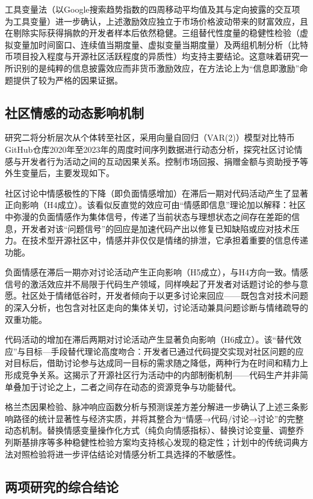 工具变量法（以Google搜索趋势指数的四周移动平均值及其与定向披露的交互项为工具变量）进一步确认，上述激励效应独立于市场价格波动带来的财富效应，且在剔除实际获得捐款的开发者样本后依然稳健。三组替代性度量的稳健性检验（虚拟变量加时间窗口、连续值当期度量、虚拟变量当期度量）及两组机制分析（比特币项目投入程度与开源社区活跃程度的异质性）均支持主要结论。这意味着研究一所识别的是纯粹的信息披露效应而非货币激励效应，在方法论上为“信息即激励”命题提供了较为严格的因果证据。

\subsection{社区情感的动态影响机制}

研究二将分析层次从个体转至社区，采用向量自回归（VAR(2)）模型对比特币GitHub仓库2020年至2023年的周度时间序列数据进行动态分析，探究社区讨论情感与开发者行为活动之间的互动因果关系。控制市场回报、捐赠金额与资助授予等外生变量后，主要发现如下。

社区讨论中情感极性的下降（即负面情感增加）在滞后一期对代码活动产生了显著正向影响（H4成立）。该看似反直觉的效应可由“情感即信息”理论加以解释\cite{schwarz1983moods}：社区中弥漫的负面情感作为集体信号，传递了当前状态与理想状态之间存在差距的信息，开发者对该“问题信号”的回应是加速代码产出以修复已知缺陷或应对技术压力。在技术型开源社区中，情感并非仅仅是情绪的排泄，它承担着重要的信息传递功能。

负面情感在滞后一期亦对讨论活动产生正向影响（H5成立），与H4方向一致。情感信号的激活效应并不局限于代码生产领域，同样唤起了开发者对话题讨论的参与意愿。社区处于情绪低谷时，开发者倾向于以更多讨论来回应——既包含对技术问题的深入分析，也包含对社区走向的集体关切，讨论活动兼具问题诊断与情绪疏导的双重功能。

代码活动的增加在滞后两期对讨论活动产生显著负向影响（H6成立）。该“替代效应”与目标—手段替代理论高度吻合\cite{kruglanski2002theory}：开发者已通过代码提交实现对社区问题的应对目标后，借助讨论参与达成同一目标的需求随之降低，两种行为在时间和精力上形成竞争关系。这揭示了开源社区行为活动中的内部制衡机制——代码生产并非简单叠加于讨论之上，二者之间存在动态的资源竞争与功能替代。

格兰杰因果检验、脉冲响应函数分析与预测误差方差分解进一步确认了上述三条影响路径的统计显著性与经济实质，并将其整合为“情感→代码/讨论→讨论”的完整动态机制。替换情感变量操作化方式（纯负向情感指标）、替换讨论变量、调整乔列斯基排序等多种稳健性检验方案均支持核心发现的稳定性；计划中的传统词典方法对照检验将进一步评估结论对情感分析工具选择的不敏感性。

\subsection{两项研究的综合结论}

